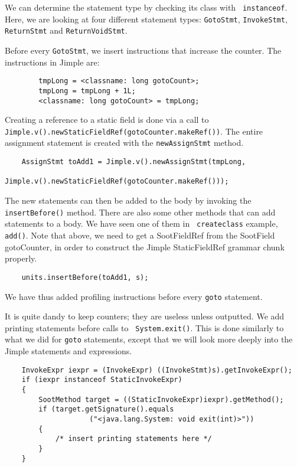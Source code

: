 \documentclass{article}
\begin{document}
We can determine the statement type by checking its class with {\tt
instanceof}.  Here, we are looking at four different statement types:
{\tt GotoStmt}, {\tt InvokeStmt}, {\tt ReturnStmt} and {\tt ReturnVoidStmt}.

Before every {\tt GotoStmt}, we insert instructions that increase the
counter. The instructions in Jimple are:

\begin{verbatim}
        tmpLong = <classname: long gotoCount>;
        tmpLong = tmpLong + 1L;
        <classname: long gotoCount> = tmpLong;
\end{verbatim}

Creating a reference to a static field is done via a call to
{\tt Jimple.v().newStaticFieldRef(gotoCounter.makeRef())}. The entire
assignment statement is created with the {\tt newAssignStmt} method.

\begin{verbatim}
    AssignStmt toAdd1 = Jimple.v().newAssignStmt(tmpLong,
                                Jimple.v().newStaticFieldRef(gotoCounter.makeRef()));
\end{verbatim}

The new statements can then be added to the body by invoking the {\tt
insertBefore()} method.  There are also some other methods that can
add statements to a body.  We have seen one of them in {\tt
createclass} example, {\tt add()}.  Note that above, we need to get a
SootFieldRef from the SootField gotoCounter, in order to construct the
Jimple StaticFieldRef grammar chunk properly.

\begin{verbatim}
    units.insertBefore(toAdd1, s);
\end{verbatim}

We have thus added profiling instructions before every {\tt goto} statement. 

It is quite dandy to keep counters; they are useless unless
outputted. We add printing statements before calls to {\tt
System.exit()}.  This is done similarly to what we did for {\tt goto}
statements, except that we will look more deeply into the Jimple
statements and expressions.

\begin{verbatim}
    InvokeExpr iexpr = (InvokeExpr) ((InvokeStmt)s).getInvokeExpr();
    if (iexpr instanceof StaticInvokeExpr)
    {
        SootMethod target = ((StaticInvokeExpr)iexpr).getMethod();
        if (target.getSignature().equals
                    ("<java.lang.System: void exit(int)>"))
        {
            /* insert printing statements here */
        }
    }
\end{verbatim}
\end{document}
